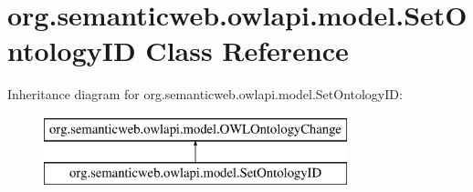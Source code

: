 \hypertarget{classorg_1_1semanticweb_1_1owlapi_1_1model_1_1_set_ontology_i_d}{\section{org.\-semanticweb.\-owlapi.\-model.\-Set\-Ontology\-I\-D Class Reference}
\label{classorg_1_1semanticweb_1_1owlapi_1_1model_1_1_set_ontology_i_d}
}
Inheritance diagram for org.\-semanticweb.\-owlapi.\-model.\-Set\-Ontology\-I\-D\-:\begin{figure}[H]
\begin{center}
\leavevmode
\includegraphics[height=2.000000cm]{classorg_1_1semanticweb_1_1owlapi_1_1model_1_1_set_ontology_i_d}
\end{center}
\end{figure}
